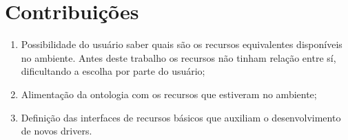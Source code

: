 \section{Contribuições}

\begin{enumerate}
	\item Possibilidade do usuário saber quais são os recursos equivalentes disponíveis no ambiente. Antes deste trabalho os recursos não tinham relação entre sí, dificultando a escolha por parte do usuário;
	\item Alimentação da ontologia com os recursos que estiveram no ambiente;
	\item Definição das interfaces de recursos básicos que auxiliam o desenvolvimento de novos drivers.
\end{enumerate}